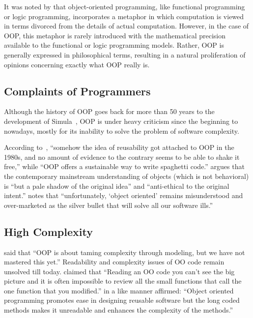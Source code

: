 It was noted by \citet{danforth1988type} that
object-oriented programming, like functional programming or logic programming,
incorporates a metaphor in which computation is viewed in terms divorced from the
details of actual computation. However, in the case of OOP, this metaphor is rarely introduced
with the mathematical precision available to the functional or logic programming
models. Rather, OOP is generally expressed in philosophical terms,
resulting in a natural proliferation of opinions concerning
exactly what OOP really is.

\subsection{Complaints of Programmers}

Although the history of OOP goes back for more than
50 years to the development of Simula~\citep{dahl1966simula}, OOP is under heavy
criticism since the beginning to nowadays, mostly for its inability
to solve the problem of software complexity.

According to~\citet{graham2004hackers}, ``somehow the idea of reusability
got attached to OOP in the 1980s, and no amount of evidence to the contrary
seems to be able to shake it free,'' while
``OOP offers a sustainable way to write spaghetti code.''
\citet{west2004object} argues that the contemporary mainstream understanding
of objects (which is not behavioral) is ``but a pale shadow of the original idea'' and
``anti-ethical to the original intent.''
\citet{gosling1995java} notes that
``unfortunately, `object oriented' remains misunderstood and
over-marketed as the silver bullet that will solve all our software ills.''

\subsection{High Complexity}

\citet{nierstrasz2010ten} said that ``OOP is about taming
complexity through modeling, but we have not mastered this yet.''
Readability and complexity issues of OO code remain unsolved till
today. \citet{shelly2015flaws} claimed that ``Reading an OO
code you can't see the big picture and it is often impossible to review all the
small functions that call the one function that you modified.''
\citet{khanam2018} in a like manner affirmed: ``Object oriented programming
promotes ease in designing reusable software but the long coded methods makes
it unreadable and enhances the complexity of the methods.''

